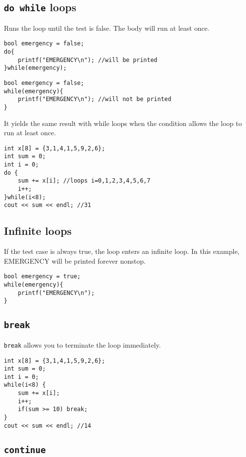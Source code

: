 \subsection{\texttt{do while} loops}
Runs the loop until the test is false. The body will run at least once.

\begin{lstlisting}
bool emergency = false;
do{
    printf("EMERGENCY\n"); //will be printed
}while(emergency);
\end{lstlisting}

\begin{lstlisting}
bool emergency = false;
while(emergency){
    printf("EMERGENCY\n"); //will not be printed
}
\end{lstlisting}

It yields the same result with while loops when the condition allows the loop to run at least once.

\begin{lstlisting}
int x[8] = {3,1,4,1,5,9,2,6};
int sum = 0;
int i = 0;
do { 
    sum += x[i]; //loops i=0,1,2,3,4,5,6,7
    i++;
}while(i<8);
cout << sum << endl; //31
\end{lstlisting}

\subsection{Infinite loops}

If the test case is always true, the loop enters an infinite loop. In this example, EMERGENCY will be printed forever nonstop.

\begin{lstlisting}
bool emergency = true;
while(emergency){
    printf("EMERGENCY\n");
}
\end{lstlisting}
\vspace{6mm}

\subsection{\texttt{break}}

\texttt{break} allows you to terminate the loop immediately.

\begin{lstlisting}
int x[8] = {3,1,4,1,5,9,2,6};
int sum = 0;
int i = 0;
while(i<8) { 
    sum += x[i];
    i++;
    if(sum >= 10) break;
}
cout << sum << endl; //14
\end{lstlisting}

\subsection{\texttt{continue}}

